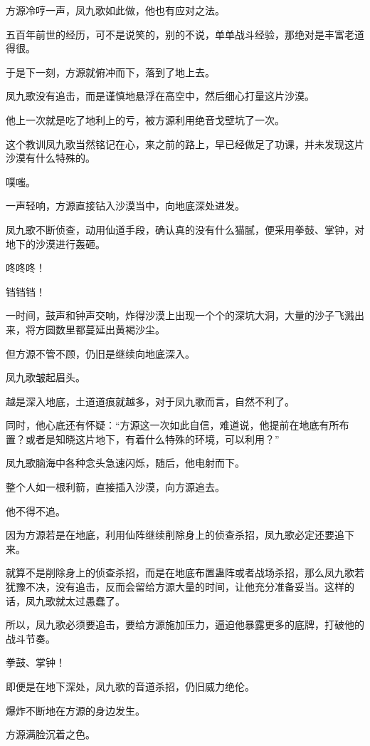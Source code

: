 \begin{this_body}
方源冷哼一声，凤九歌如此做，他也有应对之法。

五百年前世的经历，可不是说笑的，别的不说，单单战斗经验，那绝对是丰富老道得很。

于是下一刻，方源就俯冲而下，落到了地上去。

凤九歌没有追击，而是谨慎地悬浮在高空中，然后细心打量这片沙漠。

他上一次就是吃了地利上的亏，被方源利用绝音戈壁坑了一次。

这个教训凤九歌当然铭记在心，来之前的路上，早已经做足了功课，并未发现这片沙漠有什么特殊的。

噗嗤。

一声轻响，方源直接钻入沙漠当中，向地底深处进发。

凤九歌不断侦查，动用仙道手段，确认真的没有什么猫腻，便采用拳鼓、掌钟，对地下的沙漠进行轰砸。

咚咚咚！

铛铛铛！

一时间，鼓声和钟声交响，炸得沙漠上出现一个个的深坑大洞，大量的沙子飞溅出来，将方圆数里都蔓延出黄褐沙尘。

但方源不管不顾，仍旧是继续向地底深入。

凤九歌皱起眉头。

越是深入地底，土道道痕就越多，对于凤九歌而言，自然不利了。

同时，他心底还有怀疑：“方源这一次如此自信，难道说，他提前在地底有所布置？或者是知晓这片地下，有着什么特殊的环境，可以利用？”

凤九歌脑海中各种念头急速闪烁，随后，他电射而下。

整个人如一根利箭，直接插入沙漠，向方源追去。

他不得不追。

因为方源若是在地底，利用仙阵继续削除身上的侦查杀招，凤九歌必定还要追下来。

就算不是削除身上的侦查杀招，而是在地底布置蛊阵或者战场杀招，那么凤九歌若犹豫不决，没有追击，反而会留给方源大量的时间，让他充分准备妥当。这样的话，凤九歌就太过愚蠢了。

所以，凤九歌必须要追击，要给方源施加压力，逼迫他暴露更多的底牌，打破他的战斗节奏。

拳鼓、掌钟！

即便是在地下深处，凤九歌的音道杀招，仍旧威力绝伦。

爆炸不断地在方源的身边发生。

方源满脸沉着之色。


\end{this_body}
